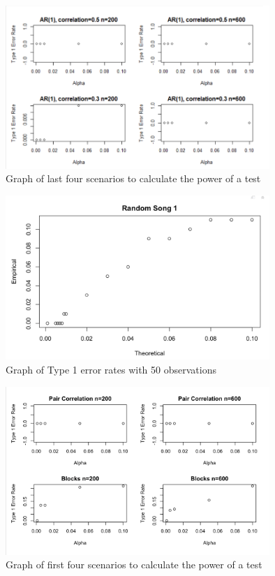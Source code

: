 \documentclass[12pt, letterpaper]{article}
\begin{document}
\begin{figure}[!hb]
\centering
\includegraphics[width=10cm]{PowerGraphs2.png}
\caption{Graph of last four scenarios to calculate the power of a test}
\label{fig: Power Graphs 2}
\end{figure}

\begin{figure}[!hb]
\centering
\includegraphics[width=10cm]{EmpiricalvsTheoreticalAlpha.png}
\caption{Graph of Type 1 error rates with 50 observations}
\label{fig: Type 1 Error, n=50}
\end{figure}

\begin{figure}[!hb]
\centering
\includegraphics[width=10cm]{Blocks&PairCorrelation.png}
\caption{Graph of first four scenarios to calculate the power of a test}
\label{fig: Power Graphs 1}
\end{figure}
\end{document}
